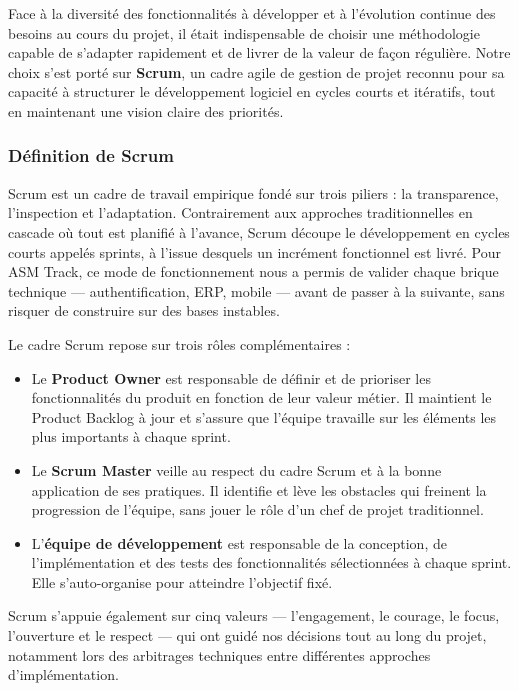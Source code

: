 Face à la diversité des fonctionnalités à développer et à l'évolution continue des besoins
au cours du projet, il était indispensable de choisir une méthodologie capable de s'adapter
rapidement et de livrer de la valeur de façon régulière. Notre choix s'est porté sur
\textbf{Scrum}, un cadre agile de gestion de projet reconnu pour sa capacité à structurer
le développement logiciel en cycles courts et itératifs, tout en maintenant une vision
claire des priorités.

\subsubsection{Définition de Scrum}

Scrum est un cadre de travail empirique fondé sur trois piliers : la transparence, l'inspection
et l'adaptation. Contrairement aux approches traditionnelles en cascade où tout est planifié
à l'avance, Scrum découpe le développement en cycles courts appelés sprints, à l'issue
desquels un incrément fonctionnel est livré. Pour ASM Track, ce mode de fonctionnement
nous a permis de valider chaque brique technique — authentification, ERP, mobile — avant
de passer à la suivante, sans risquer de construire sur des bases instables.

Le cadre Scrum repose sur trois rôles complémentaires :

\begin{itemize}
  \item Le \textbf{Product Owner} est responsable de définir et de prioriser les
        fonctionnalités du produit en fonction de leur valeur métier. Il maintient
        le Product Backlog à jour et s'assure que l'équipe travaille sur les éléments
        les plus importants à chaque sprint.

  \item Le \textbf{Scrum Master} veille au respect du cadre Scrum et à la bonne
        application de ses pratiques. Il identifie et lève les obstacles qui freinent
        la progression de l'équipe, sans jouer le rôle d'un chef de projet traditionnel.

  \item L'\textbf{équipe de développement} est responsable de la conception, de
        l'implémentation et des tests des fonctionnalités sélectionnées à chaque sprint.
        Elle s'auto-organise pour atteindre l'objectif fixé.
\end{itemize}

Scrum s'appuie également sur cinq valeurs — l'engagement, le courage, le focus,
l'ouverture et le respect — qui ont guidé nos décisions tout au long du projet, notamment
lors des arbitrages techniques entre différentes approches d'implémentation.

